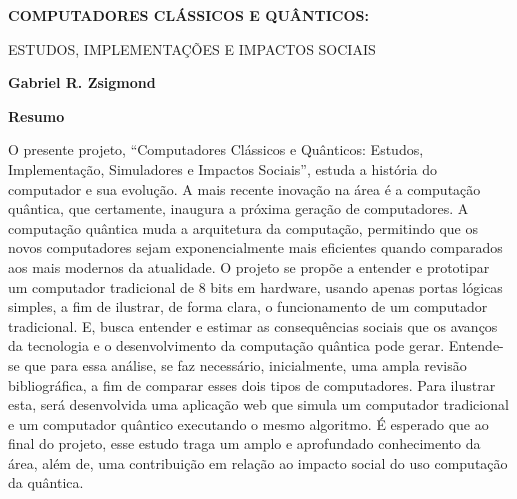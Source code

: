 \thispagestyle{plain}
\begin{center}
    \Large
    \textbf{COMPUTADORES CLÁSSICOS E QUÂNTICOS:}
    
    \vspace{0.2cm}
    \large
    ESTUDOS, IMPLEMENTAÇÕES E IMPACTOS SOCIAIS
    
    \vspace{0.2cm}
    \textbf{Gabriel R. Zsigmond}
    
    \vspace{0.4cm}
    \textbf{Resumo}
\end{center}
O presente projeto, ``Computadores Clássicos e Quânticos: Estudos, Implementação, Simuladores e Impactos Sociais'', estuda a história do computador e sua evolução. A mais recente inovação na área é a computação quântica, que certamente, inaugura a próxima geração de computadores. A computação quântica muda a arquitetura da computação, permitindo que os novos computadores sejam exponencialmente mais eficientes quando comparados aos mais modernos da atualidade. O projeto se propõe a entender e prototipar um computador tradicional de 8 bits em hardware, usando apenas portas lógicas simples, a fim de ilustrar, de forma clara, o funcionamento de um computador tradicional. E, busca entender e estimar as consequências sociais que os avanços da tecnologia e o desenvolvimento da computação quântica pode gerar. Entende-se que para essa análise, se faz necessário, inicialmente, uma ampla revisão bibliográfica, a fim de comparar esses dois tipos de computadores. Para ilustrar esta, será desenvolvida uma aplicação web que simula um computador tradicional e um computador quântico executando o mesmo algoritmo. É esperado que ao final do projeto, esse estudo traga um amplo e aprofundado conhecimento da área, além de, uma contribuição em relação ao impacto social do uso computação da quântica.